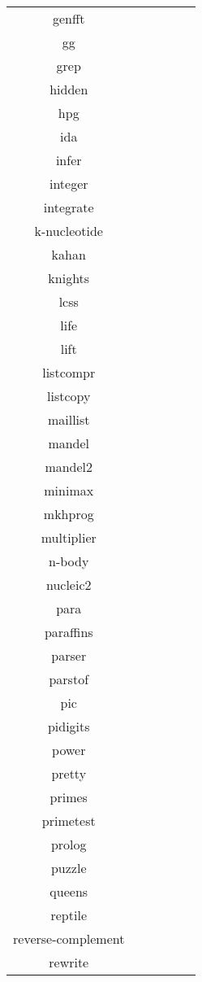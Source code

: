\begin{tabular}{ c c c c c c }
genfft &  &  &  &  & \\
gg &  &  &  &  & \\
grep &  &  &  &  & \\
hidden &  &  &  &  & \\
hpg &  &  &  &  & \\
ida &  &  &  &  & \\
infer &  &  &  &  & \\
integer &  &  &  &  & \\
integrate &  &  &  &  & \\
k-nucleotide &  &  &  &  & \\
kahan &  &  &  &  & \\
knights &  &  &  &  & \\
lcss &  &  &  &  & \\
life &  &  &  &  & \\
lift &  &  &  &  & \\
listcompr &  &  &  &  & \\
listcopy &  &  &  &  & \\
maillist &  &  &  &  & \\
mandel &  &  &  &  & \\
mandel2 &  &  &  &  & \\
minimax &  &  &  &  & \\
mkhprog &  &  &  &  & \\
multiplier &  &  &  &  & \\
n-body &  &  &  &  & \\
nucleic2 &  &  &  &  & \\
para &  &  &  &  & \\
paraffins &  &  &  &  & \\
parser &  &  &  &  & \\
parstof &  &  &  &  & \\
pic &  &  &  &  & \\
pidigits &  &  &  &  & \\
power &  &  &  &  & \\
pretty &  &  &  &  & \\
primes &  &  &  &  & \\
primetest &  &  &  &  & \\
prolog &  &  &  &  & \\
puzzle &  &  &  &  & \\
queens &  &  &  &  & \\
reptile &  &  &  &  & \\
reverse-complement &  &  &  &  & \\
rewrite &  &  &  &  & \\

\end{tabular}
